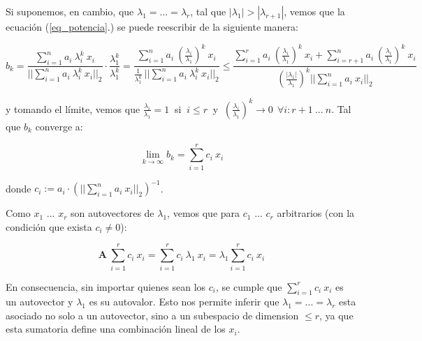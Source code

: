 \vspace{2em}
\noindent Si suponemos, en cambio, que $\lambda_1 = ... = \lambda_r$, tal que $|\lambda_1| > |\lambda_{r + 1}|$, vemos que la ecuación (\ref{eq_potencia}.) se puede reescribir de la siguiente manera:

\begin{equation*} \label{eq_limite}
    b_k = \frac{\sum_{i=1}^{n} a_i \ \lambda_{i}^{k} \ x_i }{||\sum_{i=1}^{n} a_i \ \lambda_{i}^{k} \ x_i||_2} \cdot \frac{\lambda_1^k}{\lambda_1^k} 
        = \frac{\sum_{i=1}^{n} a_i \ (\frac{\lambda_{i}}{\lambda_{1}})^{k} \ x_i}{\frac{1}{\lambda_{1}^{k}}\ ||\sum_{i=1}^{n} a_i \ \lambda_{i}^{k} \ x_i||_2}
        \leq \frac{\sum_{i=1}^{r} a_i\ (\frac{\lambda_{i}}{\lambda_{1}})^{k}\ x_i + \sum_{i=r+1}^{n} a_i \ (\frac{\lambda_{i}}{\lambda_{1}})^{k} \ x_i }{(\frac{|\lambda_{1}|}{\lambda_{1}})^k ||\sum_{i=1}^{n} a_i \ x_i||_2}
\end{equation*}

\vspace{1em}
\noindent y tomando el límite, vemos que $\frac{\lambda_{i}}{\lambda_{1}} = 1\ $ si $\ i \leq r\ $ y $\ (\frac{\lambda_{i}}{\lambda_{1}})^{k} \longrightarrow 0 \ \ \forall i: r + 1\ ...\ n$. Tal que $b_k$ converge a:

\begin{equation*}
    \lim_{k \to \infty} b_k = \sum_{i=1}^{r} c_i\ x_i  
\end{equation*}

\vspace{1em}
\noindent donde $c_i := a_i \cdot (||\sum_{i=1}^{n} a_i \ x_i||_2)^{-1}$. 


\newpage
\noindent Como $x_1$ ... $x_r$ son autovectores de $\lambda_1$, vemos que para $c_1$ ... $c_r$ arbitrarios (con la condición que exista $c_i \neq 0$):

\begin{equation*}
    \mathbf{A} \ \sum_{i=1}^{r} c_i\ x_i = \sum_{i=1}^{r} c_i\ \lambda_1\ x_i = \lambda_1 \sum_{i=1}^{r} c_i\ x_i
\end{equation*}

\vspace{1em}
En consecuencia, sin importar quienes sean los $c_i$, se cumple que $\sum_{i=1}^{r} c_i\ x_i$ es un autovector y $\lambda_1$ es su autovalor. Esto nos permite inferir que $\lambda_1 = ... =\lambda_r$ esta asociado no solo a un autovector, sino a un subespacio de dimension $ \leq r$, ya que esta sumatoria define una combinación lineal de los $x_i$.   

